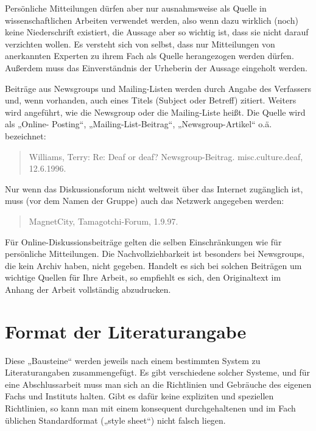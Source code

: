 \documentclass[]{book}
\theoremstyle{definition}
\theoremstyle{definition}
\theoremstyle{definition}
\theoremstyle{remark}
\begin{document}
Persönliche Mitteilungen dürfen aber nur ausnahmsweise als Quelle in
wissenschaftlichen Arbeiten verwendet werden, also wenn dazu wirklich
(noch) keine Niederschrift existiert, die Aussage aber so wichtig ist,
dass sie nicht darauf verzichten wollen. Es versteht sich von selbst,
dass nur Mitteilungen von anerkannten Experten zu ihrem Fach als Quelle
herangezogen werden dürfen. Außerdem muss das Einverständnis der
Urheberin der Aussage eingeholt werden.

Beiträge aus Newsgroups und Mailing-Listen werden durch Angabe des
Verfassers und, wenn vorhanden, auch eines Titels (Subject oder Betreff)
zitiert. Weiters wird angeführt, wie die Newsgroup oder die
Mailing-Liste heißt. Die Quelle wird als „Online- Posting``,
„Mailing-List-Beitrag``, „Newsgroup-Artikel`` o.ä. bezeichnet:

\begin{quote}
Williams, Terry: Re: Deaf or deaf? Newsgroup-Beitrag. misc.culture.deaf,
12.6.1996.
\end{quote}

Nur wenn das Diskussionsforum nicht weltweit über das Internet
zugänglich ist, muss (vor dem Namen der Gruppe) auch das Netzwerk
angegeben werden:

\begin{quote}
MagnetCity, Tamagotchi-Forum, 1.9.97.
\end{quote}

Für Online-Diskussionsbeiträge gelten die selben Einschränkungen wie für
persönliche Mitteilungen. Die Nachvollziehbarkeit ist besonders bei
Newsgroups, die kein Archiv haben, nicht gegeben. Handelt es sich bei
solchen Beiträgen um wichtige Quellen für Ihre Arbeit, so empfiehlt es
sich, den Originaltext im Anhang der Arbeit vollständig abzudrucken.

\section{Format der Literaturangabe}\label{format-der-literaturangabe}

Diese „Bausteine`` werden jeweils nach einem bestimmten System zu
Literaturangaben zusammengefügt. Es gibt verschiedene solcher Systeme,
und für eine Abschlussarbeit muss man sich an die Richtlinien und
Gebräuche des eigenen Fachs und Instituts halten. Gibt es dafür keine
expliziten und speziellen Richtlinien, so kann man mit einem konsequent
durchgehaltenen und im Fach üblichen Standardformat („style sheet``)
nicht falsch liegen.
\end{document}
